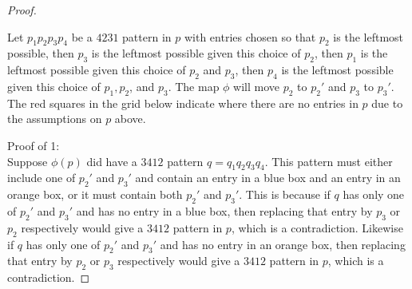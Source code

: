 \documentclass[10pt,a4paper]{amsart}
\begin{document}
\begin{proof}
\begin{figure}[h]
        \label{fig:placeholder}
    \end{figure}

    Let $p_1p_2p_3p_4$ be a $4231$ pattern in $p$ with entries chosen so that $p_2$ is the leftmost possible, then $p_3$ is the leftmost possible given this choice of $p_2$, then $p_1$ is the leftmost possible given this choice of $p_2$ and $p_3$, then $p_4$ is the leftmost possible given this choice of $p_1, p_2$, and $p_3$. The map $\phi$ will move $p_2$ to $p_2'$ and $p_3$ to $p_3'$. The red squares in the grid below indicate where there are no entries in $p$ due to the assumptions on $p$ above.

    Proof of 1:
    \\
    Suppose $\phi(p)$ did have a $3412$ pattern $q=q_1q_2q_3q_4$. This pattern must either include one of $p_2'$ and $p_3'$ and contain an entry in a blue box and an entry in an orange box, or it must contain both $p_2'$ and $p_3'$. This is because if $q$ has only one of $p_2'$ and $p_3'$ and has no entry in a blue box, then replacing that entry by $p_3$ or $p_2$ respectively would give a $3412$ pattern in $p$, which is a contradiction. Likewise if $q$ has only one of $p_2'$ and $p_3'$ and has no entry in an orange box, then replacing that entry by $p_2$ or $p_3$ respectively would give a $3412$ pattern in $p$, which is a contradiction.
    

\end{proof}
\end{document}
